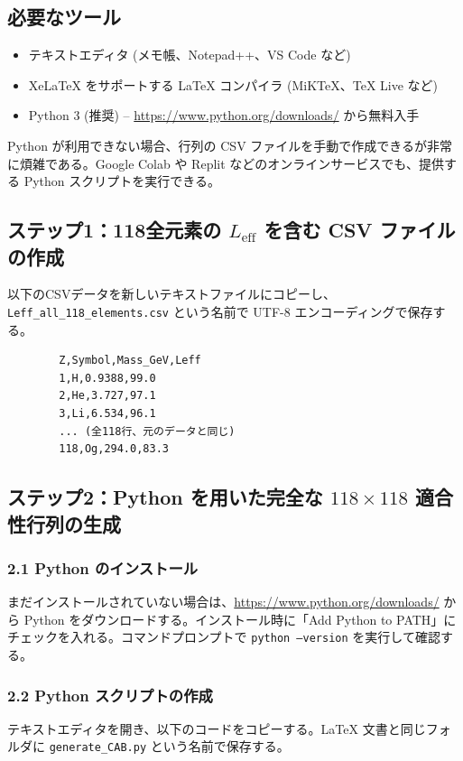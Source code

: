 \documentclass[12pt,a4paper]{article}
\begin{document}
	\subsection{必要なツール}
	\begin{itemize}
		\item テキストエディタ (メモ帳、Notepad++、VS Code など)
		\item XeLaTeX をサポートする LaTeX コンパイラ (MiKTeX、TeX Live など)
		\item Python 3 (推奨) – \url{https://www.python.org/downloads/} から無料入手
	\end{itemize}
	Python が利用できない場合、行列の CSV ファイルを手動で作成できるが非常に煩雑である。Google Colab や Replit などのオンラインサービスでも、提供する Python スクリプトを実行できる。
	
	\subsection{ステップ1：118全元素の $L_{\mathrm{eff}}$ を含む CSV ファイルの作成}
	以下のCSVデータを新しいテキストファイルにコピーし、\texttt{Leff\_all\_118\_elements.csv} という名前で UTF-8 エンコーディングで保存する。
	
	\begin{verbatim}
		Z,Symbol,Mass_GeV,Leff
		1,H,0.9388,99.0
		2,He,3.727,97.1
		3,Li,6.534,96.1
		... (全118行、元のデータと同じ)
		118,Og,294.0,83.3
	\end{verbatim}
	
	\subsection{ステップ2：Python を用いた完全な $118\times118$ 適合性行列の生成}
	\subsubsection{2.1 Python のインストール}
	まだインストールされていない場合は、\url{https://www.python.org/downloads/} から Python をダウンロードする。インストール時に「Add Python to PATH」にチェックを入れる。コマンドプロンプトで \texttt{python --version} を実行して確認する。
	
	\subsubsection{2.2 Python スクリプトの作成}
	テキストエディタを開き、以下のコードをコピーする。LaTeX 文書と同じフォルダに \texttt{generate\_CAB.py} という名前で保存する。
	
\end{document}
